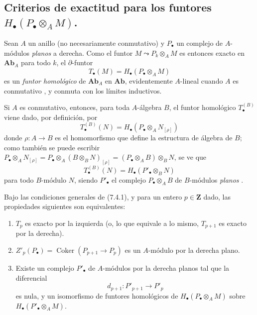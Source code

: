 \subsection{Criterios de exactitud para los funtores
$H_\bullet(P_\bullet\otimes_A M)$.}
\label{subsection:III.7.4.fr}

\begin{env}[7.4.1]
\label{III.7.4.1}
Sean $A$ un anillo (no necesariamente conmutativo) y $P_\bullet$ un complejo
de $A$-módulos \emph{planos} a derecha. Como el funtor
$M\leadsto P_k\otimes_A M$ es entonces exacto en $\boldsymbol{Ab}_A$ para todo $k$,
el $\partial$-funtor
\[
  T_\bullet(M)=H_\bullet(P_\bullet\otimes_A M)
  \tag{7.4.1.1}\label{III.7.4.1.1.fr}
\]
es un \emph{funtor homológico} de $\boldsymbol{Ab}_A$ en $\boldsymbol{Ab}$,
evidentemente $A$-lineal cuando $A$ es conmutativo
, y conmuta con los límites inductivos.

Si $A$ es conmutativo, entonces, para toda $A$-álgebra $B$, el funtor
homológico $T_\bullet^{(B)}$  viene dado, por definición, por
\[
  T_\bullet^{(B)}(N)
  =
  H_\bullet(P_\bullet\otimes_A N_{[\rho]})
  \tag{7.4.1.2}\label{III.7.4.1.2.fr}
\]
donde $\rho:A\to B$ es el homomorfismo que define la estructura de álgebra de
$B$; como también se puede escribir
$P_\bullet\otimes_A N_{[\rho]}=P_\bullet\otimes_A(B\otimes_B N)_{[\rho]}=(P_\bullet\otimes_A B)\otimes_B N$,
se ve que
\[
  T_\bullet^{(B)}(N)=H_\bullet(P'_\bullet\otimes_B N)
  \tag{7.4.1.3}\label{III.7.4.1.3.fr}
\]
para todo $B$-módulo $N$, siendo $P'_\bullet$ el complejo
$P_\bullet\otimes_A B$ de $B$-módulos \emph{planos}
.
\end{env}

\begin{proposition}[7.4.2]
Bajo las condiciones generales de \textup{(7.4.1)}, y para un entero $p\in\mathbf Z$
dado, las propiedades siguientes son equivalentes:
\begin{enumerate}
  \item[a)] $T_p$ es exacto por la izquierda \textup{(o, lo que equivale a lo mismo,} $T_{p+1}$
    es exacto por la derecha).
  \item[b)] $Z'_p(P_\bullet)=\operatorname{Coker}(P_{p+1}\longrightarrow P_p)$
    es un $A$-módulo por la derecha plano.
  \item[c)] Existe un complejo $P'_\bullet$ de $A$-módulos por la derecha planos
    tal que la diferencial
    \[
      d_{p+1}:P'_{p+1}\longrightarrow P'_p
    \]
    es nula, y un isomorfismo de funtores homológicos de
    $H_\bullet(P_\bullet\otimes_A M)$ sobre
    $H_\bullet(P'_\bullet\otimes_A M)$.
\end{enumerate}
\end{proposition}

